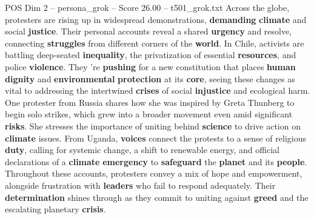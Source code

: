 \begin{textsample}{POS Dim 2 – persona\_grok – Score 26.00 – t501\_grok.txt}  \label{ex:f2_pos_037}
Across the globe, protesters are rising up in widespread demonstrations, \textbf{demanding} \textbf{climate} and social \textbf{justice}.
Their personal accounts reveal a shared \textbf{urgency} and resolve, connecting \textbf{struggles} from different corners of the \textbf{world}.
In Chile, activists are battling deep-seated \textbf{inequality}, the privatization of essential \textbf{resources}, and police \textbf{violence}.
They 're \textbf{pushing} for a new constitution that places \textbf{human} \textbf{dignity} and \textbf{environmental} \textbf{protection} at its \textbf{core}, seeing these changes as vital to addressing the intertwined \textbf{crises} of social \textbf{injustice} and ecological harm.
One protester from Russia shares how she was inspired by Greta Thunberg to begin solo strikes, which grew into a broader movement even amid significant \textbf{risks}.
She stresses the importance of uniting behind \textbf{science} to drive action on \textbf{climate} issues.
From Uganda, \textbf{voices} connect the protests to a sense of religious \textbf{duty}, calling for systemic change, a shift to renewable energy, and official declarations of a \textbf{climate} \textbf{emergency} to \textbf{safeguard} the \textbf{planet} and its \textbf{people}.
Throughout these accounts, protesters convey a mix of hope and empowerment, alongside frustration with \textbf{leaders} who fail to respond adequately.
Their \textbf{determination} shines through as they commit to uniting against \textbf{greed} and the escalating planetary \textbf{crisis}.

\end{textsample}
